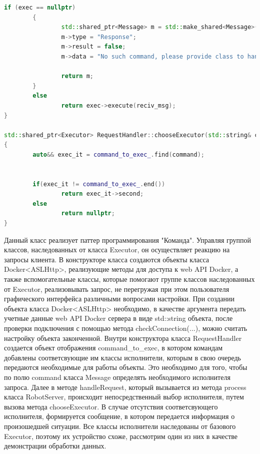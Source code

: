 \documentclass[a4paper, 14pt]{extreport}
\begin{document}
\begin{lstlisting}[language=C++, frame=single, xleftmargin=15pt, caption={Определение методов класса RequestHandler},label=DescriptiveLabel]
        if (exec == nullptr)
        {
                std::shared_ptr<Message> m = std::make_shared<Message>();
                m->type = "Response";
                m->result = false;
                m->data = "No such command, please provide class to handle this type of message in message handler area";

                return m;
        }
        else
                return exec->execute(reciv_msg);
}

std::shared_ptr<Executor> RequestHandler::chooseExecutor(std::string& command)
{
        auto&& exec_it = command_to_exec_.find(command);


        if(exec_it != command_to_exec_.end())
                return exec_it->second;
        else
                return nullptr;
}
\end{lstlisting}
\par Данный класс реализует паттер программирования "Команда".
Управляя группой классов, наследованных от класса Executor, он 
осуществляет реакцию на запросы клиента. В конструкторе класса создаются объекты класса Docker<ASLHttp>, реализующие методы для 
доступа к web API Docker, а также вспомогательные классы, которые помогают группе классов наследованных от Executor, реализовывать 
запрос, не перегружая при этом пользователя графического интерфейса различными вопросами настройки. При создании объекта класса 
Docker<ASLHttp> необходимо, в качестве аргумента передать учетные данные web API Docker сервера в виде std::string объекта, после 
проверки подключения с помощью метода checkConnection(...), можно считать настройку объекта законченной. Внутри конструктора класса 
RequestHandler создается объект отображения command\_to\_exec, в котором командам добавлены соответсвующие им классы исполнители, которым 
в свою очередь передаются необходимые для работы объекты. Это необходимо для того, чтобы по полю command класса Message определять 
необходимого исполнителя запроса. Далее в методе handleRequest, который вызывается из метода process класса RobotServer, происходит 
непосредственный выбор исполнителя, путем вызова метода chooseExecutor. В случае отсутствия соответсвующего исполнителя, формируется 
сообщение, в котором передается информация о произошедшей ситуации. Все классы исполнители наследованы от базового Executor, поэтому 
их устройство схоже, рассмотрим один из них в качестве демонстрации обработки данных.
\end{document}
